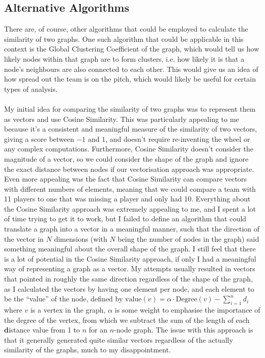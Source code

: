 \documentclass[a4paper,11pt]{article}
\begin{document}
\subsection{Alternative Algorithms}
There are, of course, other algorithms that could be employed to calculate the similarity of two graphs. 
One such algorithm that could be applicable in this context is the Global Clustering Coefficient of the graph, which would tell us how likely nodes within that
graph are to form clusters, i.e. how likely it is that a node's neighbours are also connected to each other.   
This would give us an idea of how spread out the team is on the pitch, which would likely be useful for certain types of analysis.
\\\\
My initial idea for comparing the similarity of two graphs was to represent them as vectors and use Cosine Similarity.
This was particularly appealing to me because it's a consistent and meaningful measure of the similarity of two vectors, 
giving a score between $-1$ and $1$, and doesn't require re-inventing the wheel or any complex computations. 
Furthermore, Cosine Similarity doesn't consider the magnitude of a vector, so we could consider the shape of the graph and 
ignore the exact distance between nodes if our vectorisation approach was appropriate.
Even more appealing was the fact that Cosine Similarity can compare vectors with different numbers of elements, meaning 
that we could compare a team with 11 players to one that was missing a player and only had 10. 
Everything about the Cosine Similarity approach was extremely appealing to me, and I spent a lot of time trying to get it 
to work, but I failed to define an algorithm that could translate a graph into a vector in a meaningful manner, such that 
the direction of the vector in $N$ dimensions (with $N$ being the number of nodes in the graph) said something meaningful 
about the overall shape of the graph.
I still feel that there is a lot of potential in the Cosine Similarity approach, if only I had a meaningful way of 
representing a graph as a vector. 
My attempts usually resulted in vectors that pointed in roughly the same direction regardless of the shape of the graph, as 
I calculated the vectors by having one element per node, and each element to be the ``value'' of the node, defined by
$\mathrm{value}(v) = \alpha \cdot \mathrm{Degree}(v) - \sum^n_{i = 1}{d_i}$ where $v$ is a vertex in the graph, 
$\alpha$ is some weight to emphasise the importance of the degree of the vertex, from which we subtract the sum of the 
length of each \textbf{d}istance value from 1 to $n$ for an $n$-node graph.
The issue with this approach is that it generally generated quite similar vectors regardless of the actually similarity 
of the graphs, much to my disappointment.
\end{document}
